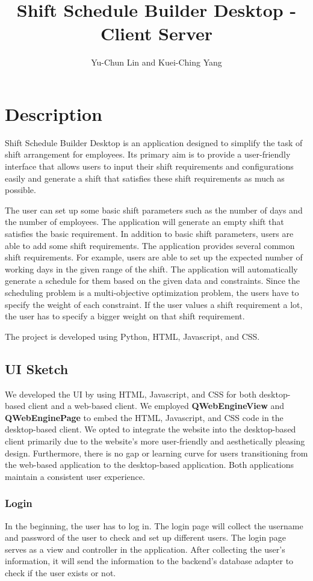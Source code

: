 \documentclass[11pt, oneside]{article}   	%
\title{Shift Schedule Builder Desktop - Client Server}
\author{Yu-Chun Lin and Kuei-Ching Yang}
\begin{document}
\maketitle
\section{Description}
Shift Schedule Builder Desktop is an application designed to simplify the task of shift arrangement for employees. Its primary aim is to provide a user-friendly interface that allows users to input their shift requirements and configurations easily and generate a shift that satisfies these shift requirements as much as possible.

The user can set up some basic shift parameters such as the number of days and the number of employees. The application will generate an empty shift that satisfies the basic requirement. In addition to basic shift parameters, users are able to add some shift requirements. The application provides several common shift requirements. For example, users are able to set up the expected number of working days in the given range of the shift. The application will automatically generate a schedule for them based on the given data and constraints. Since the scheduling problem is a multi-objective optimization problem, the users have to specify the weight of each constraint. If the user values a shift requirement a lot, the user has to specify a bigger weight on that shift requirement.

The project is developed using Python, HTML, Javascript, and CSS.
\subsection{UI Sketch}
We developed the UI by using HTML, Javascript, and CSS for both desktop-based client and a web-based client. We employed \textbf{QWebEngineView} and \textbf{QWebEnginePage} to embed the HTML, Javascript, and CSS code in the desktop-based client.
We opted to integrate the website into the desktop-based client primarily due to the website's more user-friendly and aesthetically pleasing design. Furthermore, there is no gap or learning curve for users transitioning from the web-based application to the desktop-based application. Both applications maintain a consistent user experience.

\subsubsection{Login}
In the beginning, the user has to log in. The login page will collect the username and password of the user to check and set up different users. The login page serves as a view and controller in the application. After collecting the user's information, it will send the information to the backend's database adapter to check if the user exists or not.
\end{document}

